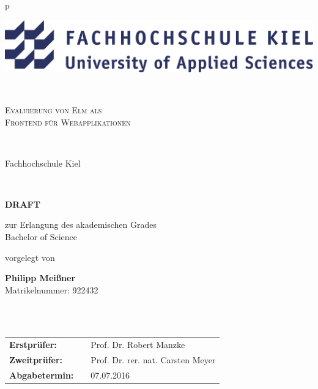 \begin{center}
\begin{tabular}{p{\textwidth}}


\begin{center}
\centerline{\includegraphics[scale=0.13]{img/logo.png}}
\end{center}


\\

\begin{center}
\LARGE{\textsc{
Evaluierung von Elm als\\ Frontend für Webapplikationen
}}
\end{center}

\\


\begin{center}
\large{Fachhochschule Kiel}
\end{center}

\\

\begin{center}
\textbf{\Large{DRAFT}}
\end{center}


\begin{center}
zur Erlangung des akademischen Grades\\
Bachelor of Science
\end{center}


\begin{center}
vorgelegt von
\end{center}

\begin{center}
\large{\textbf{Philipp Meißner}} \\
\small{Matrikelnummer: 922432}
\end{center}


\\

\\

\begin{center}
\begin{tabular}{lll}
\textbf{Erstprüfer:} & & Prof. Dr. Robert Manzke\\
\textbf{Zweitprüfer:} & &Prof. Dr. rer. nat. Carsten Meyer\\
\textbf{Abgabetermin:} & & 07.07.2016\\
\end{tabular}
\end{center}

\end{tabular}
\end{center}